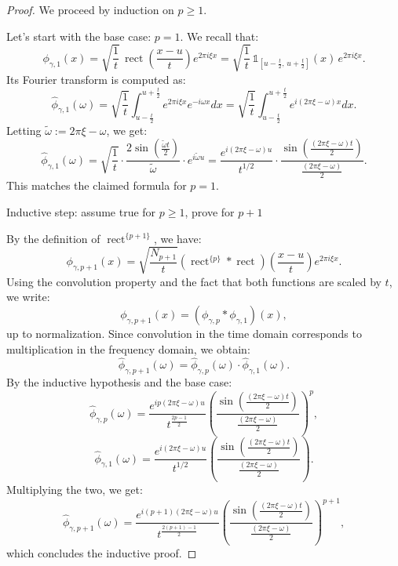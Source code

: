 \documentclass[10pt,a4paper]{amsart}
\begin{document}
\begin{proof}
We proceed by induction on $ p \ge 1 $.

Let's start with the base case: $ p = 1 $. We recall that:
$$
\phi_{\gamma,1}(x) = \sqrt{\frac{1}{t}} \, \operatorname{rect}\left( \frac{x - u}{t} \right) e^{2\pi i \xi x} = \sqrt{\frac{1}{t}} \, \mathds{1}_{[u - \frac{t}{2}, \, u + \frac{t}{2}]}(x) \, e^{2\pi i \xi x}.
$$
Its Fourier transform is computed as:
$$
\hat{\phi}_{\gamma,1}(\omega) = \sqrt{\frac{1}{t}} \int_{u - \frac{t}{2}}^{u + \frac{t}{2}} e^{2\pi i \xi x} e^{-i \omega x} dx = \sqrt{\frac{1}{t}} \int_{u - \frac{t}{2}}^{u + \frac{t}{2}} e^{i(2\pi \xi - \omega)x} dx.
$$
Letting $ \tilde{\omega} := 2\pi \xi - \omega $, we get:
$$
\hat{\phi}_{\gamma,1}(\omega) = \sqrt{\frac{1}{t}} \cdot \frac{2 \sin\left( \frac{\tilde{\omega} t}{2} \right)}{\tilde{\omega}} \cdot e^{i \tilde{\omega} u} = \frac{e^{i(2\pi \xi - \omega) u}}{t^{1/2}} \cdot \frac{ \sin\left( \frac{(2\pi \xi - \omega)t}{2} \right) }{ \frac{(2\pi \xi - \omega)}{2} }.
$$
This matches the claimed formula for $ p = 1 $.


    
Inductive step: assume true for $ p \ge 1 $, prove for $ p+1 $

By the definition of $ \operatorname{rect}^{\{p+1\}} $, we have:
$$
\phi_{\gamma,p+1}(x) = \sqrt{\frac{N_{p+1}}{t}} \left( \operatorname{rect}^{\{p\}} * \operatorname{rect} \right)\left( \frac{x - u}{t} \right) e^{2\pi i \xi x}.
$$
Using the convolution property and the fact that both functions are scaled by $ t $, we write:
$$
\phi_{\gamma,p+1}(x) = \left( \phi_{\gamma,p} * \phi_{\gamma,1} \right)(x),
$$
up to normalization. Since convolution in the time domain corresponds to multiplication in the frequency domain, we obtain:
$$
\hat{\phi}_{\gamma,p+1}(\omega) = \hat{\phi}_{\gamma,p}(\omega) \cdot \hat{\phi}_{\gamma,1}(\omega).
$$
By the inductive hypothesis and the base case:
$$
\hat{\phi}_{\gamma,p}(\omega) = \frac{e^{i p (2\pi \xi - \omega) u}}{t^{\frac{2p - 1}{2}}} \left( \frac{\sin\left( \frac{(2\pi \xi - \omega)t}{2} \right)}{ \frac{(2\pi \xi - \omega)}{2} } \right)^p,
$$
$$
\hat{\phi}_{\gamma,1}(\omega) = \frac{e^{i (2\pi \xi - \omega) u}}{t^{1/2}} \left( \frac{\sin\left( \frac{(2\pi \xi - \omega)t}{2} \right)}{ \frac{(2\pi \xi - \omega)}{2} } \right).
$$
Multiplying the two, we get:
$$
\hat{\phi}_{\gamma,p+1}(\omega) = \frac{e^{i(p+1)(2\pi \xi - \omega) u}}{t^{\frac{2(p+1) - 1}{2}}} \left( \frac{\sin\left( \frac{(2\pi \xi - \omega)t}{2} \right)}{ \frac{(2\pi \xi - \omega)}{2} } \right)^{p+1},
$$
which concludes the inductive proof.

\end{proof}
\end{document}
